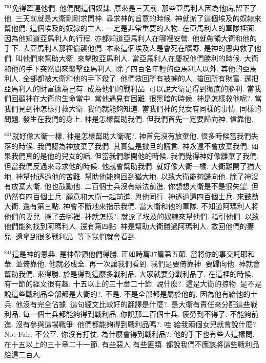 \documentclass{book}
\begin{document}
$^{761}$免得牽連他們.
他們問這個奴隸.
原來是三天前.
那些亞馬利人因為他病,留下了他.
三天前就是大衛剛剛求問神.
尋求神的旨意的時候.
神就派了這個埃及的奴隸來幫他們.
這個埃及的奴隸的主人.
一定是非常重要的人物.
在亞馬利人的軍隊裡面.
因為他知道亞馬利人的行程.
亦都知道亞馬利人在哪裡安營.
他就帶領大衛和他的手下.
去亞馬利人那裡偷襲他們.
本來這個埃及人是會死在曠野.
是神的恩典救了他們.
叫他們來幫助大衛.
來擊敗亞馬利人.
當亞馬利人在慶祝他們勝利的時候.
大衛和他的手下突然間來襲擊亞馬利人.
除了四百名年輕的亞馬利人以外.
其他的亞馬利人.
全部都被大衛和他的手下殺了.
他們救回所有被擄的人.
搶回所有財富.
還把亞馬利人的財富據為己有.
成為他們的戰利品.
可以說大衛是得到徹底的勝利.
當我們回顧神在大衛的生命當中.
當他遇見有困難.
很黑暗的時候.
神是怎樣救他呢?.
當我們見到神怎樣打救大衛.
我們就能夠知道.
當我們神的兒女有同樣的事情.
同樣的問題.
發生在我們的身上.
神是怎樣幫助我們.
但我們首先一定要歸向神.
信靠他.

$^{801}$就好像大衛一樣.
神是怎樣幫助大衛呢?.
神首先沒有放棄他.
很多時候當我們失落的時候.
我們認為神放棄了我們.
其實這是撒旦的謊言.
神永遠不會放棄我們.
如果我們真的是他的兒女的話.
但當我們離開他的時候.
我們覺得神好像離棄了我們.
但當我們反過來尋求他的時候.
他就會幫助我們.
就好像大衛一樣.
大衛離開了猶大地.
神幫他透過他的苦難.
幫助他能夠回到猶大地.
以致大衛能夠歸向他.
除了神沒有放棄大衛.
他也鼓勵他.
二百個士兵沒有辦法前進.
你想想大衛是不是很失望.
但仍然有四百個士兵.
願意和大衛一起前進.
與他同行.
神透過這四百個士兵.
來鼓勵大衛.
還有第三點.
神會不斷地來指示我們.
當大衛和他的軍隊.
不知道阿瑪利人將他們的妻兒.
擄了去哪裡.
神就怎樣?.
就派了埃及的奴隸來幫他們.
指引他們.
以致他們能夠找到阿瑪利人.
還有第四點.
神是幫助大衛勝過阿瑪利人.
救回他們的妻兒.
還拿到很多戰利品.
等下我們就會看到.

$^{841}$這是神的恩典.
是神帶領他們得勝.
正如詩篇37篇第五節.
當將你的事交託耶和華.
並倚靠他.
他就必成全.
再一次讓我們看到.
我們是要倚靠神.
要歸向他.
神就會幫助我們.
來得勝.
於是得到這麼多戰利品.
大家就要分戰利品了.
在這裡的時候.
有一節的經文很有趣.
十五以上的三十章二十節.
說什麼?.
這是大衛的掠物.
是不是說這些戰利品全部都是大衛的?.
不是.
不是全部都是屬於他的.
因為他有給他的士兵.
他沒有完全佔據.
這句經文比較好的翻譯是什麼?.
是大衛有責任來分配這些戰利品.
每一個士兵都能夠得到戰利品.
你說那二百個士兵.
疲勞到不得了.
不能夠前進.
沒有參與這場戰爭.
他們都能夠得到戰利品嗎?.
哇 給我兩個女兒就會說什麼?.
Not Fair.
不公平.
你沒有打仗.
為什麼會得到戰利品?.
他的手下也有些人這樣問.
在十五以上的三十章二十一節.
有些惡人 有些匪類.
都說我們不應該將這些戰利品給這二百人.
\end{document}
